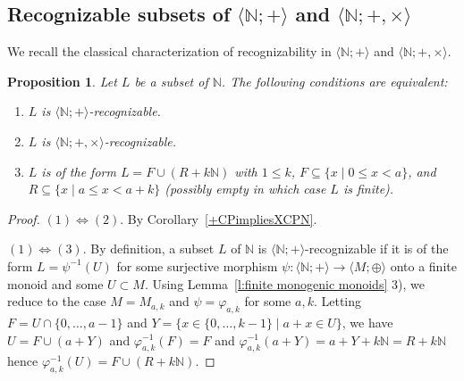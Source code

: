 \documentclass[11pt,a4paper]{article}
\newtheorem{proposition}[theorem]{Proposition}
\theoremstyle{definition} %
\newcommand\+[1]{\mathcal{#1}} %
\newcommand{\N}{{\mathbb N}}     %
\begin{document}
\subsection{Recognizable subsets of $\langle\N;+\rangle$ and  $\langle\N;+,\times\rangle$}\label{ss rec in N+}
 We recall the classical characterization of recognizability in $\langle\N;+\rangle$ and $\langle\N;+,\times\rangle$.
\begin{proposition}\label{p:folk N rec}
Let $L$ be a subset of $\N$. The following conditions are equivalent:
\begin{enumerate}\setlength{\itemsep}{0pt}
\item
$L$ is $\langle\N;+\rangle$-recognizable.
\item
$L$ is $\langle\N;+,\times\rangle$-recognizable.
\item
$L$ is of the form $L=F\cup(R+k\N)$ with
$1\leq k$, $F\subseteq\{x\mid 0\leq x<a\}$,  and $R\subseteq\{x\mid a\leq x<a+k\}$
(possibly empty in which case $L$ is finite).
\end{enumerate}
\end{proposition}
%
\begin{proof} 
$(1)\Leftrightarrow(2)$. By Corollary~\ref{+CPimpliesXCPN}.

$(1)\Leftrightarrow(3)$.
By definition, a subset $L$ of $\N$ is $\langle\N;+\rangle$-recognizable if it is of the form
$L=\psi^{-1}(U)$ for some surjective morphism 
$\psi : \langle\N;+\rangle \to \langle M;\oplus\rangle$
onto a finite monoid 
and some $U\subset M$. 
 Using  Lemma~\ref{l:finite monogenic monoids} 3),
 we reduce to the case $M=M_{a,k}$ and
$\psi=\varphi_{a,k}$ for some $a,k$.
Letting
$F=U\cap\{0,\ldots,a-1\}$ and $Y=\{x\in\{0,\ldots,k-1\}\mid a+x\in U\}$,
we have $U=F\cup(a+Y)$ and
$\varphi_{a,k}^{-1}(F)=F$ and $\varphi_{a,k}^{-1}(a+Y)=a+Y+k\N=R+k\N$
hence $\varphi_{a,k}^{-1}(U)=F\cup(R+k\N)$.
\end{proof}
\end{document}
